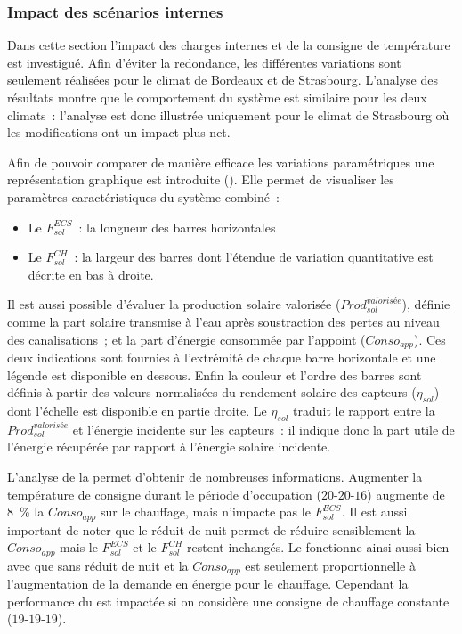 \subsubsection{Impact des scénarios internes} %
\label{ssub:impact_des_scenarios_internes}
Dans cette section l’impact des charges internes et de la consigne de température est
investigué. Afin d’éviter la redondance, les différentes variations sont seulement
réalisées pour le climat de Bordeaux et de Strasbourg. L’analyse des résultats montre
que le comportement du système est similaire pour les deux climats~: l’analyse est donc
illustrée uniquement pour le climat de Strasbourg où les modifications ont un impact plus
net.

Afin de pouvoir comparer de manière efficace les variations paramétriques une
représentation graphique est introduite (). Elle permet
de visualiser les paramètres caractéristiques du système combiné~:
\begin{itemize}
    \item Le $F_{sol}^{ECS}$~: la longueur des barres horizontales
    \item Le $F_{sol}^{CH}$~: la largeur des barres dont l’étendue de variation quantitative
          est décrite en bas à droite.
\end{itemize}
Il est aussi possible d’évaluer la production solaire valorisée
($Prod_{sol}^{valorisée}$), définie comme la part solaire transmise à l’eau après
soustraction des pertes au niveau des canalisations~; et la part d’énergie consommée
par l’appoint ($Conso_{app}$). Ces deux indications sont fournies à l’extrémité de chaque
barre horizontale et une légende est disponible en dessous.
Enfin la couleur et l’ordre des barres sont définis à partir des valeurs normalisées
du rendement solaire des capteurs ($\eta_{sol}$) dont l’échelle est disponible en partie droite. Le
$\eta_{sol}$ traduit le rapport entre la $Prod_{sol}^{valorisée}$ et l’énergie
incidente sur les capteurs~: il indique donc la part utile de l’énergie récupérée par rapport à
l’énergie solaire incidente.

L’analyse de la  permet d’obtenir de nombreuses
informations. Augmenter la température de consigne durant le période
d’occupation ($20$-$20$-$16$) augmente de \SI{8}{\percent} la $Conso_{app}$
sur le chauffage, mais n’impacte pas le $F_{sol}^{ECS}$. Il est aussi important de noter que le
réduit de nuit permet de réduire sensiblement la $Conso_{app}$ mais le $F_{sol}^{ECS}$ et le
$F_{sol}^{CH}$ restent inchangés. Le  fonctionne ainsi aussi bien avec que sans réduit de
nuit et la $Conso_{app}$ est seulement proportionnelle à l’augmentation de la demande en
énergie pour le chauffage. Cependant la performance du  est impactée si on considère
une consigne de chauffage constante ($19$-$19$-$19$).

